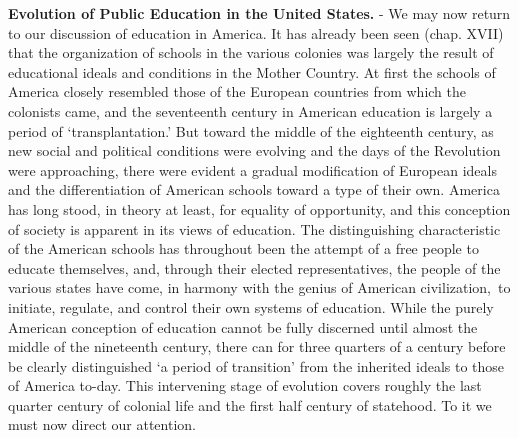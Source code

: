\documentclass[]{book}
\begin{document}
\textbf{Evolution of Public Education in the United States.} - We may now return to our discussion of education in America. It has already been seen (chap. XVII) that the organization of schools in the various colonies was largely the result of educational ideals and conditions in the Mother Country. At first the schools of America closely resembled those of the European countries from which the colonists came, and the seventeenth century in American education is largely a period of `transplantation.' But toward the middle of the eighteenth century, as new social and political conditions were evolving and the days of the Revolution were approaching, there were evident a gradual modification of European ideals and the differentiation of American schools toward a type of their own. America has long stood, in theory at least, for equality of opportunity, and this conception of society is apparent in its views of education. The distinguishing characteristic of the American schools has throughout been the attempt of a free people to educate themselves, and, through their elected representatives, the people of the various states have come, in harmony with the genius of American civilization,~to initiate, regulate, and control their own systems of education. While the purely American conception of education cannot be fully discerned until almost the middle of the nineteenth century, there can for three quarters of a century before be clearly distinguished `a period of transition' from the inherited ideals to those of America to-day. This intervening stage of evolution covers roughly the last quarter century of colonial life and the first half century of statehood. To it we must now direct our attention.
\end{document}
